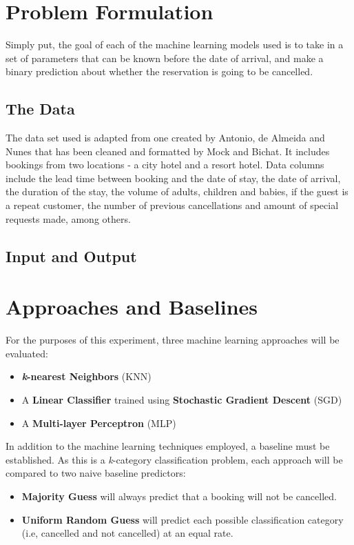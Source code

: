 \documentclass[10pt,conference]{IEEEtran}
\begin{document}
\section{Problem Formulation}
  Simply put, the goal of each of the machine learning models used is to take in a set of parameters that can be known before the date of arrival, and make a binary prediction about whether the reservation is going to be cancelled.
  \subsection{The Data}
    The data set used is adapted from one created by Antonio, de Almeida and Nunes\cite{Antonio2019} that has been cleaned and formatted by Mock and Bichat\cite{mock_bichat}. It includes bookings from two locations - a city hotel and a resort hotel. Data columns include the lead time between booking and the date of stay, the date of arrival, the duration of the stay, the volume of adults, children and babies, if the guest is a repeat customer, the number of previous cancellations and amount of special requests made, among others.
  \subsection{Input and Output}
  

\section{Approaches and Baselines}
  For the purposes of this experiment, three machine learning approaches will be evaluated:
  \begin{itemize}
    \item \textbf{\emph{k}-nearest Neighbors} (KNN) 
    \item A \textbf{Linear Classifier} trained using \textbf{Stochastic Gradient Descent} (SGD)
    \item A \textbf{Multi-layer Perceptron} (MLP)
  \end{itemize}
  In addition to the machine learning techniques employed, a baseline must be established. As this is a \emph{k}-category classification problem, each approach will be compared to two naive baseline predictors:
  \begin{itemize}
    \item \textbf{Majority Guess} will always predict that a booking will not be cancelled.
    \item \textbf{Uniform Random Guess} will predict each possible classification category (i.e, cancelled and not cancelled) at an equal rate.
  \end{itemize}
\end{document}
